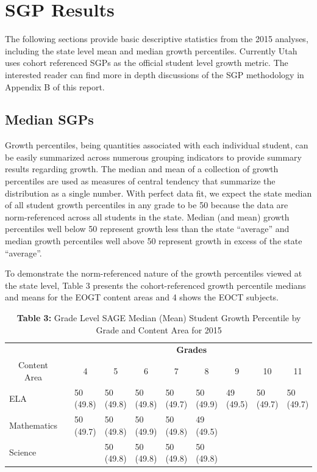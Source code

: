\documentclass[12pt]{article}
\begin{document}
\section{SGP Results}\label{sgp-results}

The following sections provide basic descriptive statistics from the
2015 analyses, including the state level mean and median growth
percentiles. Currently Utah uses cohort referenced SGPs as the official
student level growth metric. The interested reader can find more in
depth discussions of the SGP methodology in Appendix B of this report.

\subsection{Median SGPs}\label{median-sgps}

Growth percentiles, being quantities associated with each individual
student, can be easily summarized across numerous grouping indicators to
provide summary results regarding growth. The median and mean of a
collection of growth percentiles are used as measures of central
tendency that summarize the distribution as a single number. With
perfect data fit, we expect the state median of all student growth
percentiles in any grade to be 50 because the data are norm-referenced
across all students in the state. Median (and mean) growth percentiles
well below 50 represent growth less than the state ``average'' and
median growth percentiles well above 50 represent growth in excess of
the state ``average''.

To demonstrate the norm-referenced nature of the growth percentiles
viewed at the state level, Table 3 presents the cohort-referenced growth
percentile medians and means for the EOGT content areas and 4 shows the
EOCT subjects.

\begin{table}[H]
\caption*{\textbf{Table 3:} Grade Level SAGE Median (Mean) Student Growth Percentile by Grade and Content Area for 2015\label{}} 
\begin{center}
\begin{tabular}{lcllllllll}
\hline\hline
\multicolumn{1}{c}{\bfseries }&\multicolumn{1}{c}{\bfseries }&\multicolumn{8}{c}{\bfseries Grades}\tabularnewline
\cline{1-10}
\multicolumn{1}{c}{Content Area}&\multicolumn{1}{c}{}&\multicolumn{1}{c}{4}&\multicolumn{1}{c}{5}&\multicolumn{1}{c}{6}&\multicolumn{1}{c}{7}&\multicolumn{1}{c}{8}&\multicolumn{1}{c}{9}&\multicolumn{1}{c}{10}&\multicolumn{1}{c}{11}\tabularnewline
\hline
ELA&&50 (49.8)&50 (49.8)&50 (49.8)&50 (49.7)&50 (49.9)&49 (49.5)&50 (49.7)&50 (49.7)\tabularnewline
Mathematics&&50 (49.7)&50 (49.8)&50 (49.9)&50 (49.8)&49 (49.5)&&&\tabularnewline
Science&&&50 (49.8)&50 (49.8)&50 (49.8)&50 (49.8)&&&\tabularnewline
\hline
\end{tabular}\end{center}

\end{table}
\end{document}
